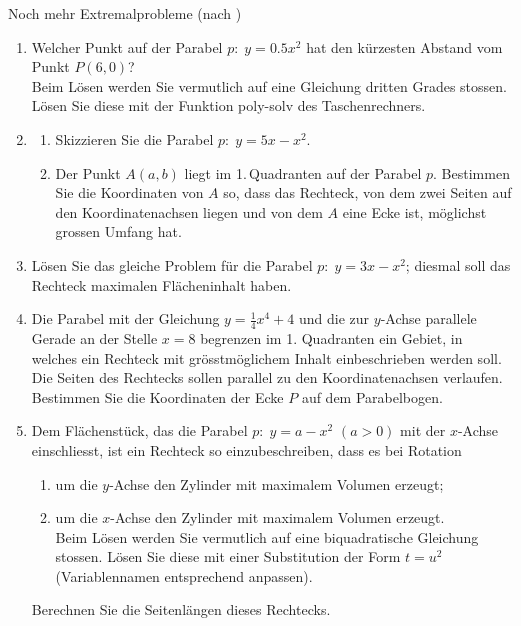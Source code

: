 \begin{ueb}
	{Noch mehr Extremalprobleme (nach )}{}
	\begin{enumerate}\setcounter{enumi}{\value{temp}}
		\item Welcher Punkt auf der Parabel \(p:\; y = 0.5x^{2}\) hat den kürzesten Abstand vom Punkt \(P(6, 0)\)? \\
		      Beim Lösen werden Sie vermutlich auf eine Gleichung dritten Grades stossen. Lösen Sie diese mit der Funktion poly-solv des Taschenrechners.
		\item
		      \begin{enumerate}
			      \item Skizzieren Sie die Parabel \(p:\; y = 5x - x^{2}\).
			      \item Der Punkt \(A(a, b)\) liegt im 1.\,Quadranten auf der Parabel \(p\). Bestimmen Sie die Koordinaten von \(A\) so, dass das Rechteck, von dem zwei Seiten auf den Koordinatenachsen liegen und von dem \(A\) eine Ecke ist, möglichst grossen Umfang hat.
		      \end{enumerate}
		\item Lösen Sie das gleiche Problem für die Parabel \(p:\; y = 3x - x^{2}\); diesmal soll das Rechteck maximalen Flächeninhalt haben.

		\item Die Parabel mit der Gleichung $y=\frac{1}{4}x^4+4$ und die zur $y$-Achse parallele Gerade an der Stelle $x=8$ begrenzen im 1. Quadranten ein Gebiet, in welches ein Rechteck mit grösstmöglichem Inhalt einbeschrieben werden soll. Die Seiten des Rechtecks sollen parallel zu den Koordinatenachsen verlaufen. Bestimmen Sie die Koordinaten der Ecke $P$ auf dem Parabelbogen.


		\item Dem Flächenstück, das die Parabel \(p:\; y = a - x^{2}\) \((a > 0)\) mit der \(x\)-Achse einschliesst, ist ein Rechteck so einzubeschreiben, dass es bei Rotation
		      \begin{enumerate}
			      \item um die \(y\)-Achse den Zylinder mit maximalem Volumen erzeugt;
			      \item um die \(x\)-Achse den Zylinder mit maximalem Volumen erzeugt. \\
			            Beim Lösen werden Sie vermutlich auf eine biquadratische Gleichung stossen. Lösen Sie diese mit einer Substitution der Form $t= u^2$ (Variablennamen entsprechend anpassen).
		      \end{enumerate}
		      Berechnen Sie die Seitenlängen dieses Rechtecks.
	\end{enumerate}


\end{ueb}


